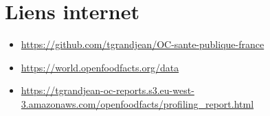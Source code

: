 \section{Liens internet}
\label{Liens}
\begin{itemize}
  \item \faGithub \url{https://github.com/tgrandjean/OC-sante-publique-france}
  \item \faDatabase \url{https://world.openfoodfacts.org/data}
  \item \faFileO \url{https://tgrandjean-oc-reports.s3.eu-west-3.amazonaws.com/openfoodfacts/profiling_report.html}
\end{itemize}
